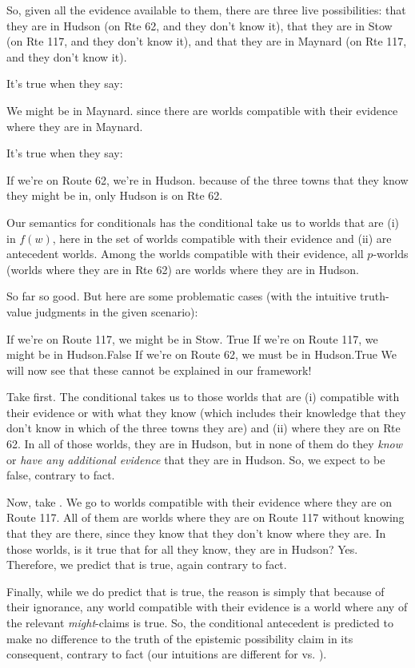 So, given all the evidence available to them, there are three live
possibilities: that they are in Hudson (on Rte 62, and they don't know it), that
they are in Stow (on Rte 117, and they don't know it), and that they are in
Maynard (on Rte 117, and they don't know it).

It's true when they say:

\ex We might be in Maynard.\xe
%
since there are worlds compatible with their evidence where they are in
Maynard.

\kwn It's true when they say:

\ex If we're on Route 62, we're in Hudson.\label{ex:bare-hudson}\xe
%
because of the three towns that they know they might be in, only Hudson
is on Rte 62.

Our semantics for conditionals has the conditional take us to worlds that are
(i) in $f(w)$, here in the set of worlds compatible with their evidence and (ii)
are antecedent worlds. Among the worlds compatible with their evidence, all
$p$-worlds (worlds where they are in Rte 62) are worlds where they are in
Hudson.

So far so good. But here are some problematic cases (with the intuitive
truth-value judgments in the given scenario):

\pex\label{ex:trouble}%
\a If we're on Route 117, we might be in Stow. \hfill True
\a If we're on Route 117, we might be in Hudson.\hfill False
\a If we're on Route 62, we must be in Hudson.\hfill True
\xe
%
We will now see that these cannot be explained in our framework!

Take \Last[c] first. The conditional takes us to those worlds that are (i)
compatible with their evidence or with what they know (which includes their
knowledge that they don't know in which of the three towns they are) and (ii)
where they are on Rte 62. In all of those worlds, they are in Hudson, but in
none of them do they \emph{know} or \emph{have any additional evidence} that
they are in Hudson. So, we expect \Last[c] to be false, contrary to fact.

Now, take \Last[b]. We go to worlds compatible with their evidence where they
are on Route 117. All of them are worlds where they are on Route 117 without
knowing that they are there, since they know that they don't know where they
are. In those worlds, is it true that for all they know, they are in Hudson?
Yes. Therefore, we predict that \Last[b] is true, again contrary to fact.

Finally, while we do predict that \Last[a] is true, the reason is simply that
because of their ignorance, any world compatible with their evidence is a world
where any of the relevant \emph{might}-claims is true. So, the conditional
antecedent is predicted to make no difference to the truth of the epistemic
possibility claim in its consequent, contrary to fact (our intuitions are
different for \Last[a] vs. \Last[b]).


